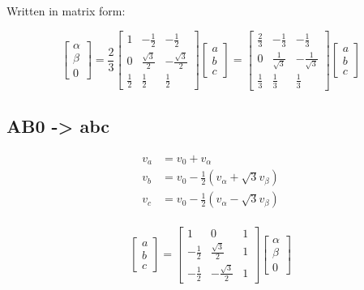 \documentclass[]{book}
\begin{document}
Written in matrix form:

\[
\begin{bmatrix} \alpha \\ \beta \\ 0 \end{bmatrix}
= \frac{2}{3} \begin{bmatrix} 1 & -\frac{1}{2} & -\frac{1}{2} \\ 0 & \frac{\sqrt{3}}{2} & -\frac{\sqrt{3}}{2} \\ \frac{1}{2} & \frac{1}{2} & \frac{1}{2} \end{bmatrix}
\begin{bmatrix} a\\ b \\ c \end{bmatrix}
= \begin{bmatrix} \frac{2}{3} & -\frac{1}{3} & -\frac{1}{3} \\ 0 & \frac{1}{\sqrt{3}} & -\frac{1}{\sqrt{3}} \\ \frac{1}{3} & \frac{1}{3} & \frac{1}{3} \end{bmatrix}
\begin{bmatrix} a\\ b \\ c \end{bmatrix}
\label{eq:transabcAB02}
\]

\hypertarget{ab0---abc}{%
\subsection{AB0 -\textgreater{} abc}\label{ab0---abc}}

\[
\begin{aligned}
v_a &= v_0 + v_\alpha \\
v_b &= v_0 - \frac{1}{2}(v_\alpha +\sqrt{3}v_\beta) \\
v_c &= v_0 - \frac{1}{2}(v_\alpha -\sqrt{3}v_\beta) \\
\end{aligned}
\label{eq:transABabc1}
\]

\[
\begin{bmatrix} a\\ b \\ c \end{bmatrix}
= \begin{bmatrix} 1 & 0 & 1 \\ -\frac{1}{2} & \frac{\sqrt{3}}{2} & 1 \\ -\frac{1}{2} & -\frac{\sqrt{3}}{2} & 1 \end{bmatrix}
\begin{bmatrix} \alpha\\ \beta \\ 0 \end{bmatrix}
\label{eq:transABabc1}
\]
\end{document}
